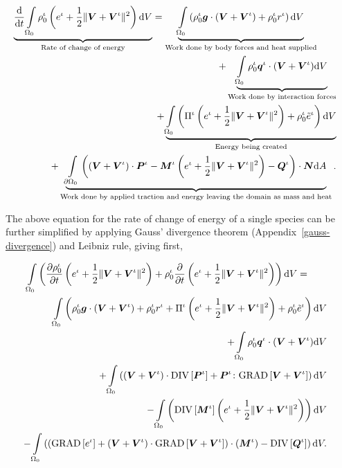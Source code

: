 \begin{eqnarray}
\underbrace{\frac{\mathrm{d}}{\mathrm{d}t} \int\limits_{\Omega_0}\rho_0^\iota
\left ( e^\iota + \frac{1}{2} \Vert\mbox{\boldmath$ V$}+\mbox{\boldmath$ V$}^\iota\Vert^2 \right )
\mathrm{d}V}_{\text{Rate of change of energy}} =
\underbrace{\int\limits_{\Omega_0} \left(\rho_0^\iota\mbox{\boldmath$ g$} 
\cdot\left(\mbox{\boldmath$ V$}+\mbox{\boldmath$ V$}^\iota\right) + \rho_0^\iota r^\iota
\right)\mathrm{d}V}_{\text{Work done by body forces and heat supplied}}\qquad& &\nonumber\\
+\underbrace{\int\limits_{\Omega_0} \rho_0^\iota\mbox{\boldmath$ q$}^\iota\cdot(\mbox{\boldmath$ V$} +
  \mbox{\boldmath$ V$}^\iota) \mathrm{d}V}_{\text{Work done by interaction forces}}& &\nonumber\\
+ \underbrace{\int\limits_{\Omega_0} \left(\Pi^\iota\left(e^\iota +
\frac{1}{2}\Vert\mbox{\boldmath$ V$}+\mbox{\boldmath$ V$}^\iota\Vert^2\right) +
\rho^\iota_0\tilde{e}^\iota\right)\mathrm{d}V}_{\text{Energy being created}} 
& & \nonumber \\ 
+ \underbrace{\int\limits_{\partial \Omega_0}
  \left(\left(\mbox{\boldmath$ V$}+\mbox{\boldmath$ V$}^\iota\right)\cdot\mbox{\boldmath$ P$}^\iota - 
\mbox{\boldmath$ M$}^\iota\left(e^\iota +\frac{1}{2}
\Vert\mbox{\boldmath$ V$}+\mbox{\boldmath$ V$}^\iota\Vert^2\right) -
\mbox{\boldmath$ Q$}^\iota\right)\cdot\mbox{\boldmath$ N$}\mathrm{d}A}_{\text{Work done by applied
    traction and energy leaving the domain as mass and heat}}.
\label{globalbalanceofenergy}
\end{eqnarray}

The above equation for the rate of change of energy of a single
species can be further simplified by applying Gauss' divergence
theorem (Appendix~\ref{gauss-divergence}) and Leibniz rule, giving
first,

\begin{eqnarray}
\int\limits_{\Omega_0}\left(\frac{\partial\rho_0^\iota}{\partial t}
\left(e^\iota + \frac{1}{2}\Vert\mbox{\boldmath$ V$}+\mbox{\boldmath$ V$}^\iota\Vert^2 \right) +
\rho^\iota_0\frac{\partial}{\partial t}\left(e^\iota +
\frac{1}{2}\Vert\mbox{\boldmath$ V$}+\mbox{\boldmath$ V$}^\iota\Vert^2 \right)\right) \mathrm{d}V
=\qquad & &\nonumber\\ \int\limits_{\Omega_0} \left(\rho_0^\iota\mbox{\boldmath$ g$}
\cdot\left(\mbox{\boldmath$ V$}+\mbox{\boldmath$ V$}^\iota\right) + \rho_0^\iota r^\iota +
\Pi^\iota\left(e^\iota +
\frac{1}{2}\Vert\mbox{\boldmath$ V$}+\mbox{\boldmath$ V$}^\iota\Vert^2\right) +
\rho^\iota_0\tilde{e}^\iota\right)\mathrm{d}V& 
& \nonumber
\\ +\int\limits_{\Omega_0}\rho_0^\iota\mbox{\boldmath$ q$}^\iota\cdot(\mbox{\boldmath$ V$}+\mbox{\boldmath$ V$}^\iota)
\mathrm{d}V&
&\nonumber\\ +\int\limits_{\Omega_0} \left(\left(\mbox{\boldmath$ V$}+\mbox{\boldmath$ V$}^\iota\right)
\cdot\mathrm{\small{DIV}}\left[\mbox{\boldmath$ P$}^\iota\right]
+ \mbox{\boldmath$ P$}^\iota\colon\mathrm{\small{GRAD}}
\left[\mbox{\boldmath$ V$}+\mbox{\boldmath$ V$}^\iota\right]\right) \mathrm{d}V& &\nonumber\\ -
\int\limits_{\Omega_0}\left(\mathrm{\small{DIV}}\left[\mbox{\boldmath$ M$}^\iota\right]
\left(e^\iota +\frac{1}{2}
\Vert\mbox{\boldmath$ V$}+\mbox{\boldmath$ V$}^\iota\Vert^2\right)\right)\mathrm{d}V & 
&\nonumber\\ -\int\limits_{\Omega_0}\left(
\left(\mathrm{\small{GRAD}}\left[e^\iota\right]+
\left(\mbox{\boldmath$ V$}+\mbox{\boldmath$ V$}^\iota\right) \cdot
\mathrm{\small{GRAD}}\left[\mbox{\boldmath$ V$}+\mbox{\boldmath$ V$}^\iota\right]\right) \cdot\left(\mbox{\boldmath$ M$}^\iota\right)
- \mathrm{\small{DIV}}\left[\mbox{\boldmath$ Q$}^\iota\right]\right)\mathrm{d}V.\nonumber
\end{eqnarray}

